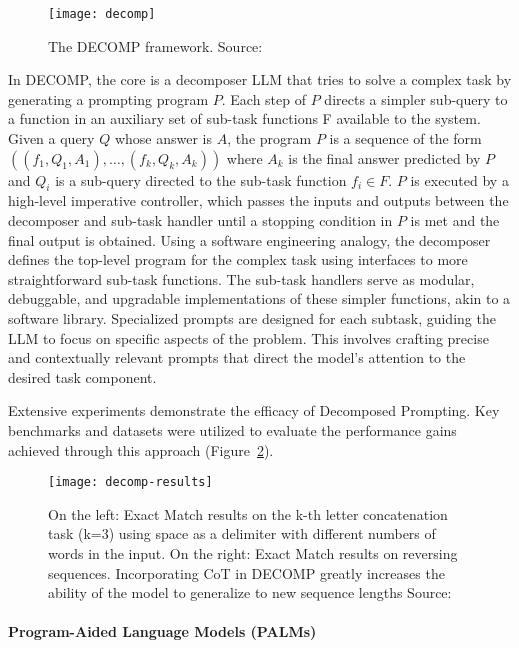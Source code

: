 \begin{figure}[h!]
	\centering
	\texttt{[image: decomp]}
	\caption{The DECOMP framework. Source: \textcite{khot2022decomposed}}
	\label{fig:decomp}
\end{figure}

In DECOMP, the core is a decomposer LLM that tries to solve a complex task by generating a prompting program $P$.
Each step of $P$ directs a simpler sub-query to a function in an auxiliary set of sub-task functions F available to the system.
Given a query $Q$ whose answer is $A$, the program $P$ is a sequence of the form $((f_1, Q_1, A_1), \ldots ,(f_k, Q_k, A_k))$
where $A_k$ is the final answer predicted by $P$ and $Q_i$ is a sub-query directed to the sub-task function $f_i \in F$.
$P$ is executed by a high-level imperative controller, which passes the inputs and outputs between the decomposer and sub-task handler until a stopping condition in $P$ is met and the final output is obtained.
Using a software engineering analogy, the decomposer defines the top-level program for the complex task using interfaces to more straightforward sub-task functions.
The sub-task handlers serve as modular, debuggable, and upgradable implementations of these simpler functions, akin to a software library.
Specialized prompts are designed for each subtask, guiding the LLM to focus on specific aspects of the problem.
This involves crafting precise and contextually relevant prompts that direct the model's attention to the desired task component.

Extensive experiments demonstrate the efficacy of Decomposed Prompting.
Key benchmarks and datasets were utilized to evaluate the performance gains achieved through this approach (Figure~\ref{fig:decomp-results}).

\begin{figure}[h!]
	\centering
	\texttt{[image: decomp-results]}
	\caption{On the left: Exact Match results on the k-th letter concatenation task (k=3) using space as a delimiter with different numbers of words in the input. On the right: Exact Match results on reversing sequences. Incorporating CoT in DECOMP greatly increases the ability of the model to generalize to new sequence lengths Source: \textcite{khot2022decomposed}}
	\label{fig:decomp-results}
\end{figure}

\paragraph{Program-Aided Language Models (PALMs)}
\label{par:program-aided-language-models}

